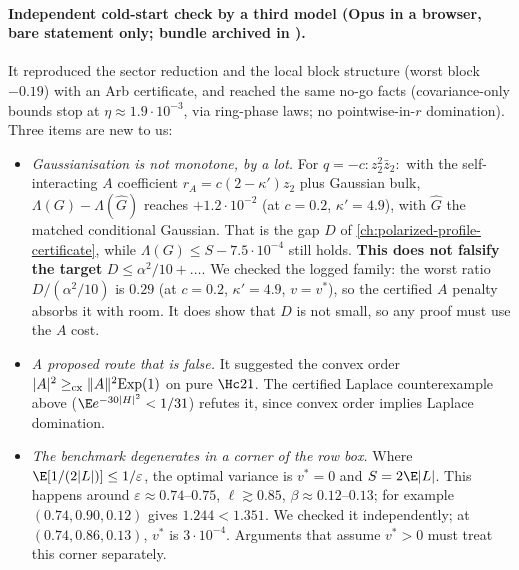 \paragraph{Independent cold-start check by a third model (Opus in a browser, bare statement only; bundle archived in ).}
It reproduced the sector reduction and the local block structure (worst block $-0.19$) with an Arb certificate, and reached the same no-go facts (covariance-only bounds stop at
$\eta\approx1.9\cdot10^{-3}$, via ring-phase laws; no pointwise-in-$r$ domination). Three items are new to us:
\begin{itemize}
\item \emph{Gaussianisation is not monotone, by a lot.} For $q=-c{:}z_2^2\bar z_2{:}$ with the self-interacting $A$ coefficient $r_A=c(2-\kappa')z_2$ plus Gaussian bulk, $\Lambda(G)-\Lambda(\hat G)$
reaches $+1.2\cdot10^{-2}$ (at $c=0.2$, $\kappa'=4.9$), with $\hat G$ the matched conditional Gaussian. That is the gap $D$ of \autoref{ch:polarized-profile-certificate}, while $\Lambda(G)\le S-7.5\cdot10^{-4}$
still holds. \textbf{This does not falsify the target} $D\le\alpha^2/10+\dots$. We checked the logged family: the worst ratio $D/(\alpha^2/10)$ is $0.29$ (at $c=0.2$, $\kappa'=4.9$,
$v=v^*$), so the certified $A$ penalty absorbs it with room. It does show that $D$ is not small, so any proof must use the $A$ cost.
\item \emph{A proposed route that is false.} It suggested the convex order $|A|^2\ge_{\rm cx}\|A\|^2\mathrm{Exp}(1)$ on pure $\Hc21$. The certified Laplace counterexample above ($\E e^{-30|H|^2}<1/31$) refutes it,
since convex order implies Laplace domination.
\item \emph{The benchmark degenerates in a corner of the row box.} Where $\E[1/(2|L|)]\le1/\varepsilon$, the optimal variance is $v^*=0$ and $S=2\E|L|$. This happens around
$\varepsilon\approx0.74$--$0.75$, $\ell\gtrsim0.85$, $\beta\approx0.12$--$0.13$; for example $(0.74,0.90,0.12)$ gives $1.244<1.351$. We checked it independently; at
$(0.74,0.86,0.13)$, $v^*$ is $3\cdot10^{-4}$. Arguments that assume $v^*>0$ must treat this corner separately.
\end{itemize}
